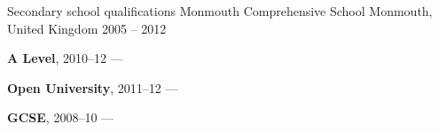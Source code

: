 \begin{cventries}
    \cventry
        {Secondary school qualifications}
        {Monmouth Comprehensive School}
        {Monmouth, United Kingdom}
        {2005 -- 2012}
        {
        \begin{cvitems}
            \item {\textbf{A Level}, 2010--12 --- }
            \vpaddingEduNorm
            \item {\textbf{Open University}, 2011--12 --- }
            \vpaddingEduNorm
            \item {\textbf{GCSE}, 2008--10 --- }
        \end{cvitems}
        }
\end{cventries}

